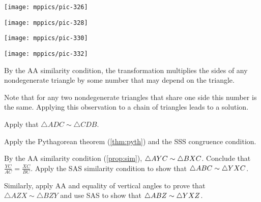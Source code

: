 \begin{multicols}{2}
\medskip

\begin{Figure}
\begin{minipage}{.49\textwidth}
\centering
\texttt{[image: mppics/pic-326]}
\end{minipage}
\hfill
\begin{minipage}{.49\textwidth}
\centering
\texttt{[image: mppics/pic-328]}
\end{minipage}
\end{Figure}

\begin{Figure}
\begin{minipage}{.49\textwidth}
\centering
\texttt{[image: mppics/pic-330]}
\end{minipage}
\hfill
\begin{minipage}{.49\textwidth}
\centering
\texttt{[image: mppics/pic-332]}
\end{minipage}
\end{Figure}

\setcounter{eqtn}{0}

By the AA similarity condition, the transformation multiplies the sides of any nondegenerate triangle by some number that may depend on the triangle. 

Note that for any two nondegenerate triangles that share one side this number is the same.
Applying this observation to a chain of triangles leads to a solution.

Apply that $\triangle ADC\sim \triangle CDB$.

Apply the Pythagorean theorem (\ref{thm:pyth}) and the SSS congruence condition.

By the AA similarity condition (\ref{prop:sim}), $\triangle AYC\z\sim \triangle BXC$.
Conclude that 
$\frac{YC}{AC}=\frac{XC}{BC}$.
Apply the SAS similarity condition to show that $\triangle ABC\z\sim \triangle YXC$.

Similarly, apply AA and equality of vertical angles to prove that $\triangle AZX\sim \triangle BZY$ and use SAS to show that $\triangle ABZ\z\sim \triangle YXZ$.



\setcounter{eqtn}{0}



\end{multicols}
